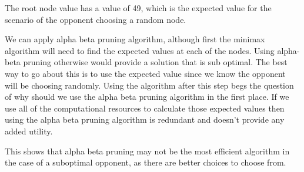 The root node value has a value of 49, which is the expected value for the scenario of the opponent
choosing a random node.

We can apply alpha beta pruning algorithm, although first the minimax algorithm will need to find the expected values at each of the nodes. Using alpha-beta pruning otherwise would provide
a solution that is sub optimal. The best way to go about this is to use the expected value since we know the opponent will be choosing randomly. Using the algorithm after this step
begs the question of why should we use the alpha beta pruning algorithm in the first place. If we use all of the computational resources to calculate those expected values then
using the alpha beta pruning algorithm is redundant and doesn't provide any added utility.

This shows that alpha beta pruning may not be the most efficient algorithm in the case of a suboptimal opponent, as there are better choices to choose from.
